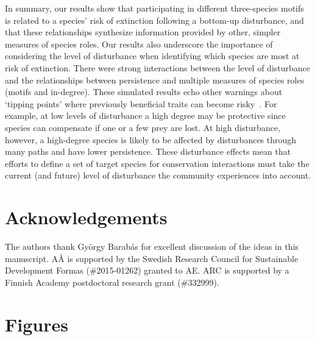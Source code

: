\documentclass[12pt]{article}
\begin{document}
\begin{spacing}{2.0}
    In summary, our results show that participating in different three-species motifs is related to a species' risk of extinction following a bottom-up disturbance, and that these relationships synthesize information provided by other, simpler measures of species roles.
    Our results also underscore the importance of considering the level of disturbance when identifying which species are most at risk of extinction.
    There were strong interactions between the level of disturbance and the relationships between persistence and multiple measures of species roles (motifs and in-degree).
    These simulated results echo other warnings about `tipping points' where previously beneficial traits can become risky~\citep{Latty2019,Golubski2016,Tylianakis2014}.
    For example, at low levels of disturbance a high degree may be protective since species can compensate if one or a few prey are lost. 
    At high disturbance, however, a high-degree species is likely to be affected by disturbances through many paths and have lower persistence.
    These disturbance effects mean that efforts to define a set of target species for conservation interactions must take the current (and future) level of disturbance the community experiences into account.
    
\section*{Acknowledgements}

    The authors thank György Barabás for excellent discussion of the ideas in this manuscript. AÅ is supported by the Swedish Research Council for Sustainable Development Formas (\#2015-01262) granted to AE. ARC is supported by a Finnish Academy postdoctoral research grant (\#332999).

\clearpage    

\section*{Figures}
    

\end{spacing}
\end{document}
